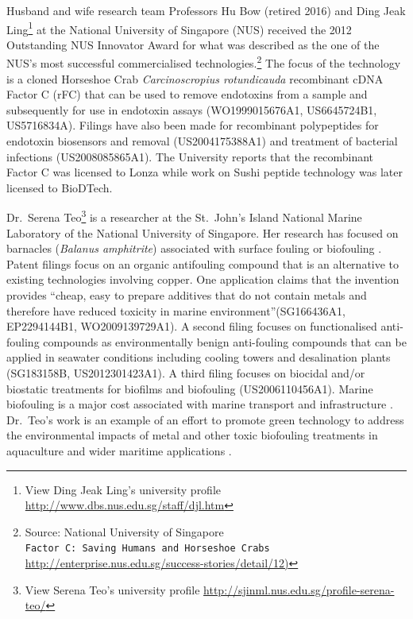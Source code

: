 \documentclass[]{book}
\let\rmarkdownfootnote\footnote%
\def\footnote{\protect\rmarkdownfootnote}
\theoremstyle{definition}
\theoremstyle{definition}
\theoremstyle{definition}
\theoremstyle{remark}
\begin{document}
Husband and wife research team Professors Hu Bow (retired 2016) and Ding
Jeak Ling\footnote{View Ding Jeak Ling's university profile
  \url{http://www.dbs.nus.edu.sg/staff/djl.htm}} at the National
University of Singapore (NUS) received the 2012 Outstanding NUS
Innovator Award for what was described as the one of the NUS's most
successful commercialised technologies.\footnote{Source: National
  University of Singapore
  \texttt{Factor\ C:\ Saving\ Humans\ and\ Horseshoe\ Crabs}
  \href{http://enterprise.nus.edu.sg/success-stories/detail/12}{http://enterprise.nus.edu.sg/success-stories/detail/12)}}
The focus of the technology is a cloned Horseshoe Crab
\emph{Carcinoscropius rotundicauda} recombinant cDNA Factor C (rFC) that
can be used to remove endotoxins from a sample and subsequently for use
in endotoxin assays (WO1999015676A1, US6645724B1, US5716834A). Filings
have also been made for recombinant polypeptides for endotoxin
biosensors and removal (US2004175388A1) and treatment of bacterial
infections (US2008085865A1). The University reports that the recombinant
Factor C was licensed to Lonza while work on Sushi peptide technology
was later licensed to BioDTech.

Dr.~Serena Teo\footnote{View Serena Teo's university profile
  \url{http://sjinml.nus.edu.sg/profile-serena-teo/}} is a researcher at
the St.~John's Island National Marine Laboratory of the National
University of Singapore. Her research has focused on barnacles
(\emph{Balanus amphitrite}) associated with surface fouling or
biofouling \citep{Phang_2009, Guo_2011, Petrone_2013}. Patent filings
focus on an organic antifouling compound that is an alternative to
existing technologies involving copper. One application claims that the
invention provides ``cheap, easy to prepare additives that do not
contain metals and therefore have reduced toxicity in marine
environment''(SG166436A1, EP2294144B1, WO2009139729A1). A second filing
focuses on functionalised anti-fouling compounds as environmentally
benign anti-fouling compounds that can be applied in seawater conditions
including cooling towers and desalination plants (SG183158B,
US2012301423A1). A third filing focuses on biocidal and/or biostatic
treatments for biofilms and biofouling (US2006110456A1). Marine
biofouling is a major cost associated with marine transport and
infrastructure \citep{Callow_2011}. Dr.~Teo's work is an example of an
effort to promote green technology to address the environmental impacts
of metal and other toxic biofouling treatments in aquaculture and wider
maritime applications \citep{Callow_2011, Floerl_2016}.
\end{document}
